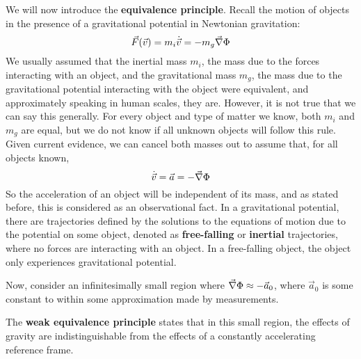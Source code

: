 \documentclass{article}
\begin{document}
 		We will now introduce the \textbf{equivalence principle}. Recall the motion of objects in the presence of a gravitational potential in Newtonian gravitation:
 		$$ \vec{F}(\vec{v}) = m_i \dot{\vec{v}} = - m_g \vec{\nabla}\Phi$$
 		We usually assumed that the inertial mass $m_i$, the mass due to the forces interacting with an object, and the gravitational mass $m_g$, the mass due to the gravitational potential interacting with the object were equivalent, and approximately speaking in human scales, they are. However, it is not true that we can say this generally. For every object and type of matter we know, both $m_i$ and $m_g$ are equal, but we do not know if all unknown objects will follow this rule. Given current evidence, we can cancel both masses out to assume that, for all objects known,
 		$$ \dot{\vec{v}} = \vec{a} = - \vec{\nabla} \Phi$$
 		So the acceleration of an object will be independent of its mass, and as stated before, this is considered as an observational fact. In a gravitational potential, there are trajectories defined by the solutions to the equations of motion due to the potential on some object, denoted as \textbf{free-falling} or \textbf{inertial} trajectories, where no forces are interacting with an object. In a free-falling object, the object only experiences gravitational potential.
 		
 		Now, consider an infinitesimally small region where $\vec{\nabla}\Phi \approx -\vec{a}_0$, where $\vec{a}_0$ is some constant to within some approximation made by measurements. 
 		
 		\begin{defn}
 			The \textbf{weak equivalence principle} states that in this small region, the effects of gravity are indistinguishable from the effects of a constantly accelerating reference frame.
 		\end{defn}
 	
\end{document}
